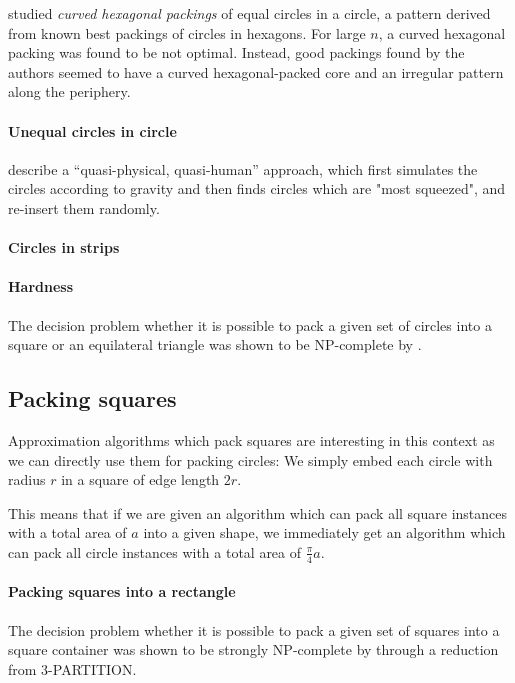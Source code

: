 \textcite{lubachevsky1997curved} studied \emph{curved hexagonal packings} of equal circles in a circle, a pattern derived from known best packings of circles in hexagons. For large $n$, a curved hexagonal packing was found to be not optimal. Instead, good packings found by the authors seemed to have a curved hexagonal-packed core and an irregular pattern along the periphery.

\paragraph{Unequal circles in circle}

\textcite{WHZX2002improved} describe a “quasi-physical, quasi-human” approach, which first simulates the circles according to gravity and then finds circles which are "most squeezed", and re-insert them randomly.

\paragraph{Circles in strips}

\paragraph{Hardness}

The decision problem whether it is possible to pack a given set of circles into a square or an equilateral triangle was shown to be NP-complete by \textcite{DFL2010circle}.

\subsection{Packing squares}

Approximation algorithms which pack squares are interesting in this context as we can directly use them for packing circles: We simply embed each circle with radius $r$ in a square of edge length $2r$.

This means that if we are given an algorithm which can pack all square instances with a total area of $a$ into a given shape, we immediately get an algorithm which can pack all circle instances with a total area of $\frac{\pi}{4}a$.

\paragraph{Packing squares into a rectangle}

The decision problem whether it is possible to pack a given set of squares into a square container was shown to be strongly NP-complete by \textcite{LTWYC1990packing} through a reduction from \textsc{3-PARTITION}.

